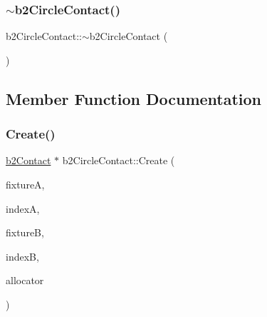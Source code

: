 \mbox{\label{classb2_circle_contact_a231b3f142bbea245eb37ebc89f142b2a}} 
\subsubsection{\texorpdfstring{$\sim$b2CircleContact()}{~b2CircleContact()}}
{\footnotesize\ttfamily b2\+Circle\+Contact\+::$\sim$b2\+Circle\+Contact (\begin{DoxyParamCaption}{ }\end{DoxyParamCaption})\hspace{0.3cm}{\ttfamily [inline]}}



\subsection{Member Function Documentation}
\mbox{\label{classb2_circle_contact_ab0ea452487cb19217ae8480dbc22fd41}} 
\subsubsection{\texorpdfstring{Create()}{Create()}}
{\footnotesize\ttfamily \mbox{\hyperlink{classb2_contact}{b2\+Contact}} $\ast$ b2\+Circle\+Contact\+::\+Create (\begin{DoxyParamCaption}\item[{\mbox{\hyperlink{classb2_fixture}{b2\+Fixture}} $\ast$}]{fixtureA,  }\item[{\mbox{\hyperlink{b2_settings_8h_a43d43196463bde49cb067f5c20ab8481}{int32}}}]{indexA,  }\item[{\mbox{\hyperlink{classb2_fixture}{b2\+Fixture}} $\ast$}]{fixtureB,  }\item[{\mbox{\hyperlink{b2_settings_8h_a43d43196463bde49cb067f5c20ab8481}{int32}}}]{indexB,  }\item[{\mbox{\hyperlink{classb2_block_allocator}{b2\+Block\+Allocator}} $\ast$}]{allocator }\end{DoxyParamCaption})\hspace{0.3cm}{\ttfamily [static]}}

\mbox{\label{classb2_circle_contact_a4ca67c653a18d88180e49149f0df742a}} 
